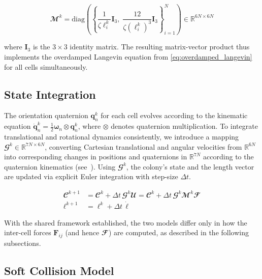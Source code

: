 \documentclass[a4paper,fleqn]{cas-dc}
\begin{document}
\begin{equation}
    \mathbfcal{M}^k = \mathrm{diag}
    \left(
    \left\{
    \frac{1}{\zeta \ell_i^k}\mathbf{I}_3,\;
    \frac{12}{\zeta (\ell_i^k)^3}\mathbf{I}_3
    \right\}_{i=1}^{N}
    \right)
    \in \mathbb{R}^{6N \times 6N}
\end{equation}

where $\mathbf{I}_3$ is the $3 \times 3$ identity matrix. The resulting matrix-vector product thus implements the overdamped Langevin equation from \autoref{eq:overdamped_langevin} for all cells simultaneously.

\subsection{State Integration}

The orientation quaternion $\mathbf{q}_n^k$ for each cell evolves according to the kinematic equation $\dot{\mathbf{q}}_n^k = \frac{1}{2} \boldsymbol{\omega}_n \otimes \mathbf{q}_n^k$, where $\otimes$ denotes quaternion multiplication. To integrate translational and rotational dynamics consistently, we introduce a mapping $\mathbfcal{G}^k \in \mathbb{R}^{7N \times 6N}$, converting Cartesian translational and angular velocities from $\mathbb{R}^{6N}$ into corresponding changes in positions and quaternions in $\mathbb{R}^{7N}$ according to the quaternion kinematics (see~\cite{Weady2024SM,Yan2022,Tasora2008}). Using $\mathbfcal{G}^k$, the colony's state and the length vector are updated via explicit Euler integration with step-size $\Delta t$.

\begin{equation} \label{eq:colony_update}
    \begin{aligned}
        \mathbfcal{C}^{k+1}     & = \mathbfcal{C}^k + \Delta t \, \mathbfcal{G}^k \mathbfcal{U} = \mathbfcal{C}^k + \Delta t \, \mathbfcal{G}^k \mathbfcal{M}^k \mathbfcal{F} \\
        \boldsymbol{\ell}^{k+1} & = \boldsymbol{\ell}^k + \Delta t \, \dot{\boldsymbol{\ell}}
    \end{aligned}
\end{equation}

With the shared framework established, the two models differ only in how the inter-cell forces $\mathbf{F}_{ij}$ (and hence $\mathbfcal{F}$) are computed, as described in the following subsections.

\subsection{Soft Collision Model}
\end{document}
